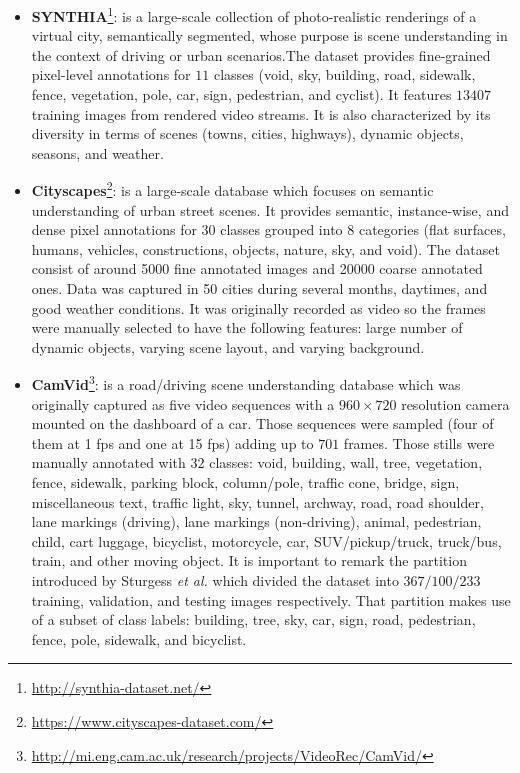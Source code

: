 \begin{itemize}
	\item \textbf{\ac{SYNTHIA}}\cite{Ros2016}\footnote{\url{http://synthia-dataset.net/}}: is a large-scale collection of photo-realistic renderings of a virtual city, semantically segmented, whose purpose is scene understanding in the context of driving or urban scenarios.The dataset provides fine-grained pixel-level annotations for $11$ classes (void, sky, building, road, sidewalk, fence, vegetation, pole, car, sign, pedestrian, and cyclist). It features $13407$ training images from rendered video streams. It is also characterized by its diversity in terms of scenes (towns, cities, highways), dynamic objects, seasons, and weather.
	\item \textbf{Cityscapes}\cite{Cordts2015}\footnote{\url{https://www.cityscapes-dataset.com/}}: is a large-scale database which focuses on semantic understanding of urban street scenes. It provides semantic, instance-wise, and dense pixel annotations for 30 classes grouped into 8 categories (flat surfaces, humans, vehicles, constructions, objects, nature, sky, and void). The dataset consist of around 5000 fine annotated images and 20000 coarse annotated ones. Data was captured in 50 cities during several months, daytimes, and good weather conditions. It was originally recorded as video so the frames were manually selected to have the following features: large number of dynamic objects, varying scene layout, and varying background.
	\item \textbf{CamVid}\cite{Brostow2008}\cite{Brostow2009}\footnote{\url{http://mi.eng.cam.ac.uk/research/projects/VideoRec/CamVid/}}: is a road/driving scene understanding database which was originally captured as five video sequences with a $960\times720$ resolution camera mounted on the dashboard of a car. Those sequences were sampled (four of them at 1 fps and one at 15 fps) adding up to $701$ frames. Those stills were manually annotated with $32$ classes: void, building, wall, tree, vegetation, fence, sidewalk, parking block, column/pole, traffic cone, bridge, sign, miscellaneous text, traffic light, sky, tunnel, archway, road, road shoulder, lane markings (driving), lane markings (non-driving), animal, pedestrian, child, cart luggage, bicyclist, motorcycle, car, SUV/pickup/truck, truck/bus, train, and other moving object. It is important to remark the partition introduced by Sturgess \emph{et al.}\cite{Sturgess2009} which divided the dataset into $367/100/233$ training, validation, and testing images respectively. That partition makes use of a subset of class labels: building, tree, sky, car, sign, road, pedestrian, fence, pole, sidewalk, and bicyclist.

\end{itemize}
